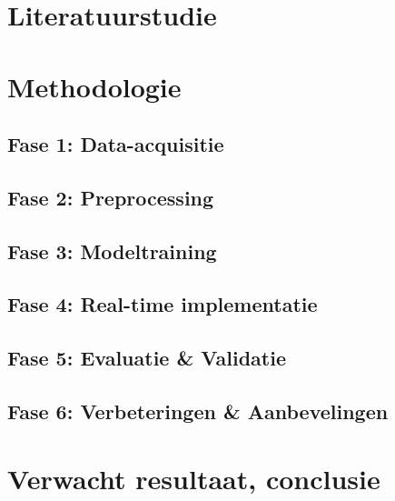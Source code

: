 \section{Literatuurstudie}%
\label{sec:literatuurstudie}


\section{Methodologie}%
\label{sec:methodologie}
\subsection{Fase 1: Data-acquisitie}
\subsection{Fase 2: Preprocessing}
\subsection{Fase 3: Modeltraining}
\subsection{Fase 4: Real-time implementatie}
\subsection{Fase 5: Evaluatie \& Validatie}
\subsection{Fase 6: Verbeteringen \& Aanbevelingen
}
\section{Verwacht resultaat, conclusie}%
\label{sec:verwachte_resultaten}
